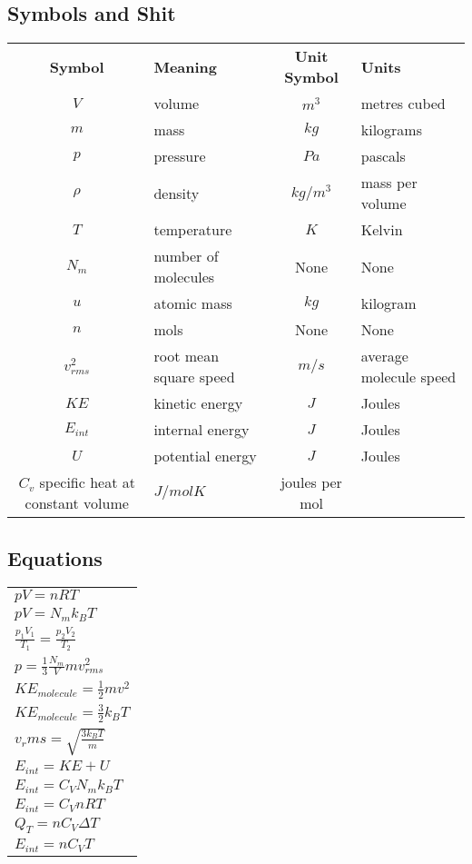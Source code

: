 \documentclass[12pt, letterpaper, twoside]{article}
\begin{document}
  \subsection*{Symbols and Shit}
    \begin{tabular}{c l c l}
  	  \textbf{Symbol} & \textbf{Meaning} & \textbf{Unit Symbol} & \textbf{Units}\\
  	  $V$ & volume & $m^3$ & metres cubed\\
  	  $m$ & mass & $kg$ & kilograms\\
  	  $p$ & pressure & $Pa$ & pascals\\
  	  $\rho$ & density & $kg/m^3$ & mass per volume\\
  	  $T$ & temperature & $K$ & Kelvin\\
  	  $N_m$ & number of molecules & None & None\\
  	  $u$ & atomic mass & $kg$ & kilogram\\
  	  $n$ & mols & None & None\\
  	  $v_{rms}^2$ & root mean square speed & $m/s$ & average molecule speed\\
  	  $KE$ & kinetic energy & $J$ & Joules\\
  	  $E_{int}$ & internal energy & $J$ & Joules\\
  	  $U$ & potential energy & $J$ & Joules\\
  	  $C_v$ specific heat at constant volume & $J/mol K$ & joules per mol\\
  	  
    \end{tabular}
  
  \subsection*{Equations}
    \begin{tabular}{l}
      $pV = nRT$\\
      $pV = N_mk_BT$\\
      $\frac{p_1V_1}{T_1} = \frac{p_2V_2}{T_2}$\\
      $p = \frac{1}{3} \frac{N_m}{V} m v_{rms}^2$\\
      $KE_{molecule} = \frac{1}{2}mv^2$\\
      $KE_{molecule} = \frac{3}{2}k_BT$\\
      $v_rms = \sqrt{\frac{3k_BT}{m}}$\\
      $E_{int} = KE + U$\\
      $E_{int} = C_V N_m k_B T$\\
      $E_{int} = C_V nRT$\\
      $Q_T = n C_V \Delta T$\\
      $E_{int} = nC_VT$\\
      
      
   \end{tabular}
  
\end{document}

